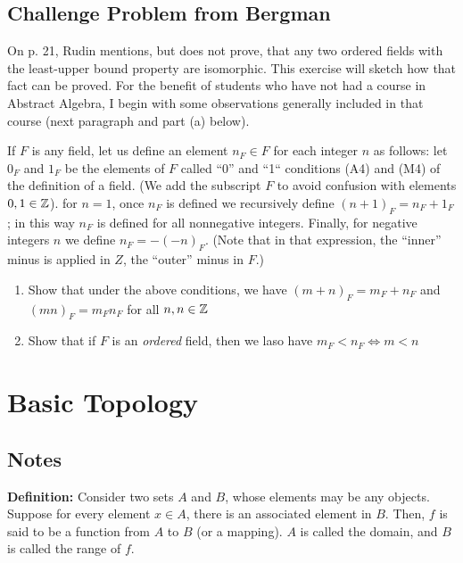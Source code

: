\documentclass[10pt]{article}
\newenvironment{definition}{\textbf{Definition:}}{}
\begin{document}
	\subsection{Challenge Problem from Bergman}
	On p. 21, Rudin mentions, but does not prove, that any two ordered fields with the least-upper bound property 
	are isomorphic. This exercise will sketch how that fact can be proved. For the benefit of students who 
	have not had a course in Abstract Algebra, I begin with some observations generally included in that course 
	(next paragraph and part (a) below). 

	If \( F \) is any field, let us define an element \( n_F \in F\) for each integer \( n \) as follows: let 
	\( 0_F \) and \( 1_F \) be the elements of \( F \) called ``0'' and ``1`` conditions (A4) and 
	(M4) of the definition of a field. (We add the subscript \( F \) to avoid confusion with elements \( 0, 1 
	\in \mathbb Z\)). for \( n = 1 \), once \( n_F \) is defined we recursively define \( (n+1)_F = n_F + 1_F \) ; in this 
	way \( n_F \) is defined for all nonnegative integers. Finally, for negative integers \( n \) we define 
	\( n_F = -(-n)_F \). (Note that in that expression, the ``inner'' minus is applied in \( Z \), the ``outer'' 
	minus in \( F \).) 
	\begin{enumerate}[label=\alph*)]
		\item Show that under the above conditions, we have \( (m + n)_F = m_F + n_F \) and 
			\( (mn)_F = m_F n_F \) for all \( n, n \in \mathbb Z \)
		\item Show that if \( F \) is an \textit{ordered} field, then we laso have \( m_F < n_F \iff m < n \)
	\end{enumerate}

	\section{Basic Topology}
	
	\subsection{Notes}
	\begin{definition}
		Consider two sets \( A \) and \( B \), whose elements may be any objects. Suppose for every element 
		\( x \in A \), there is an associated element in \( B \). Then, \( f \) is said to be a 
		function from  \( A \) to \( B \) (or a mapping). \( A \) is called the domain, and \( B \) is called
		the range of \( f \).  
	\end{definition}
\end{document}
